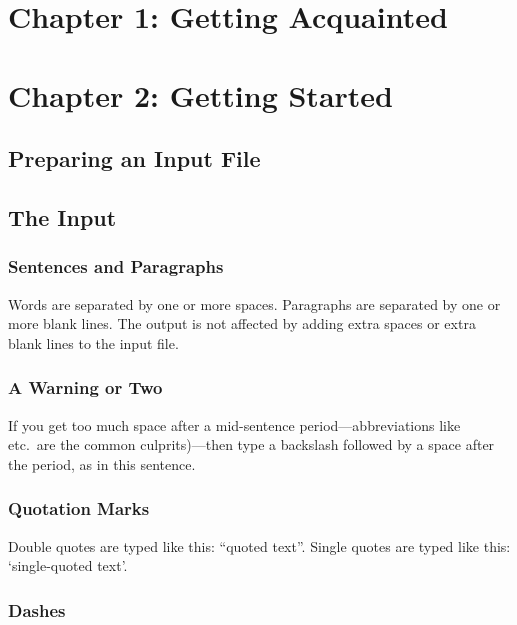 \documentclass[twocolumn]{article}        %
\begin{document}

\section{Chapter 1: Getting Acquainted}

\section{Chapter 2: Getting Started}

\subsection{Preparing an Input File}

\subsection{The Input}

\subsubsection{Sentences and Paragraphs}

Words are separated by one or more spaces.  Paragraphs are separated by
one or more blank lines.  The output is not affected by adding extra
spaces or extra blank lines to the input file.


\subsubsection*{A Warning or Two}  %

If you get too much space after a mid-sentence period---abbreviations
like etc.\ are the common culprits)---then type a backslash followed by
a space after the period, as in this sentence.

\subsubsection*{Quotation Marks}

Double quotes are typed like this: ``quoted text''.
Single quotes are typed like this: `single-quoted text'.

\subsubsection*{Dashes}
\end{document}
